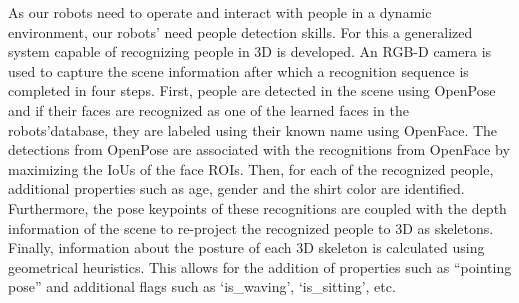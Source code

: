 \label{sec:pers_recog}
As our robots need to operate and interact with people in a dynamic environment, our robots’ need people detection skills. For this a generalized system capable of recognizing people in 3D is developed. An RGB-D camera is used to capture the scene information after which a recognition sequence is completed in four steps. First, people are detected in the scene using OpenPose and if their faces are recognized as one of the learned faces in the robots'database, they are labeled using their known name using OpenFace. The detections from OpenPose are associated with the recognitions from OpenFace by maximizing the IoUs of the face ROIs. Then, for each of the recognized people, additional properties such as age, gender and the shirt color are identified. Furthermore, the pose keypoints of these recognitions are coupled with the depth information of the scene to re-project the recognized people to 3D as skeletons. Finally, information about the posture of each 3D skeleton is calculated using geometrical heuristics. This allows for the addition of properties such as “pointing pose” and additional flags such as `is\_waving', `is\_sitting', etc.
%
